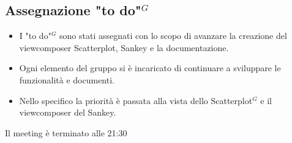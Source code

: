 \subsection{Assegnazione "to do"$^{G}$}
\begin{itemize}
	\item I "to do"$^{G}$ sono stati assegnati con lo scopo di avanzare la creazione del viewcomposer Scatterplot, Sankey e la documentazione.
	\item Ogni elemento del gruppo si è incaricato di continuare a sviluppare le funzionalità e documenti.
	\item Nello specifico la priorità è passata alla vista dello Scatterplot$^{G}$ e il viewcomposer del Sankey.
\end{itemize}

Il meeting è terminato alle 21:30

